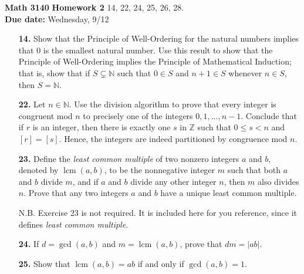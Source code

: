 \documentclass[12pt,reqno]{amsart}
\renewcommand{\subset}{\ensuremath{\subsetneq}}
\newcommand{\boldemph}{\emph}
\newcommand{\lcm}{\operatorname{lcm}}
\begin{document}
\thispagestyle{empty}

\noindent \textbf{Math 3140}  \hfill {\bf Homework 2}
\vskip1cm
  14, 22, 24, 25, 26, 28.  \\
{\bf Due date:} Wednesday, 9/12

\medskip

\begin{enumerate}

\item[{\bf 14.}]
Show that the Principle of Well-Ordering for the natural numbers implies that 0 is the smallest natural number.  Use this result to show that the Principle of Well-Ordering implies the Principle of Mathematical Induction; that is, show that if $S \subset {\mathbb N}$ such that $0 \in S$ and $n + 1 \in S$ whenever $n \in S$, then $S = \mathbb N$.  

\bigskip

\item[{\bf 22.}]
Let $n \in {\mathbb N}$.  Use the division algorithm to prove that every integer is congruent mod $n$ to precisely one of the integers $0, 1, \ldots, n-1$.  Conclude that if $r$ is an integer, then there is exactly one $s$ in ${\mathbb Z}$ such that $0 \leq s < n$ and $[r] = [s]$.   Hence, the integers are indeed partitioned by congruence mod $n$. 

\bigskip

\item[{\bf 23.}]
Define the \boldemph{least common multiple} of two nonzero integers $a$ and $b$, denoted by $\lcm(a,b)$\label{leastcm}, to be the nonnegative integer $m$ such that both $a$ and $b$ divide $m$, and if $a$ and $b$  divide any other integer $n$, then $m$ also divides $n$.  Prove that any two integers $a$ and $b$ have a unique least common multiple. 

N.B. Exercise 23 is not required. It is included here for you reference, since it defines \emph{least common multiple}.


\bigskip

\item[{\bf 24.}]
If $d= \gcd(a, b)$ and $m = \lcm(a, b)$, prove that $dm = |ab|$.


\bigskip

\item[{\bf 25.}]
Show that $\lcm(a,b) = ab$ if and only if $\gcd(a,b) = 1$.



\end{enumerate}
\end{document}
